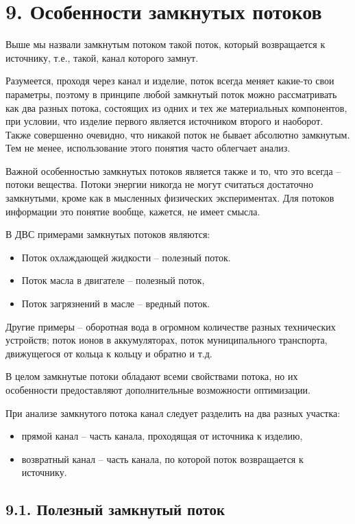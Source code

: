 \documentclass[a4paper,11pt]{article}
\begin{document}
\section{9. Особенности замкнутых потоков}

Выше мы назвали замкнутым потоком такой поток, который возвращается к
источнику, т.е., такой, канал которого замнут.

Разумеется, проходя через канал и изделие, поток всегда меняет какие-то свои
параметры, поэтому в принципе любой замкнутый поток можно рассматривать как
два разных потока, состоящих из одних и тех же материальных компонентов, при
условии, что изделие первого является источником второго и наоборот. Также
совершенно очевидно, что никакой поток не бывает абсолютно замкнутым. Тем не
менее, использование этого понятия часто облегчает анализ.

Важной особенностью замкнутых потоков является также и то, что это всегда --
потоки вещества. Потоки энергии никогда не могут считаться достаточно
замкнутыми, кроме как в мысленных физических экспериментах. Для потоков
информации это понятие вообще, кажется, не имеет смысла.

В ДВС примерами замкнутых потоков являются:
\begin{itemize}
\item Поток охлаждающей жидкости -- полезный поток.
\item Поток масла в двигателе -- полезный поток,
\item Поток загрязнений в масле -- вредный поток.
\end{itemize}
Другие примеры -- оборотная вода в огромном количестве разных технических
устройств; поток ионов в аккумуляторах, поток муниципального транспорта,
движущегося от кольца к кольцу и обратно и т.д.

В целом замкнутые потоки обладают всеми свойствами потока, но их особенности
предоставляют дополнительные возможности оптимизации.

При анализе замкнутого потока канал следует разделить на два разных участка:
\begin{itemize}
\item прямой канал -- часть канала, проходящая от источника к изделию,
\item возвратный канал -- часть канала, по которой поток возвращается к
  источнику.
\end{itemize}

\subsection{9.1. Полезный замкнутый поток}
\end{document}
